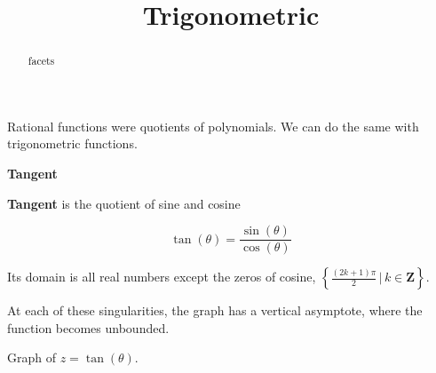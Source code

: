 \documentclass{ximera}
\title{Trigonometric}
\begin{document}
\begin{abstract}
facets
\end{abstract}
\maketitle




Rational functions were quotients of polynomials.  We can do the same with trigonometric functions.


\begin{definition}  \textbf{\textcolor{green!50!black}{Tangent}} 


\textbf{Tangent} is the quotient of sine and cosine


\[   \tan(\theta) = \frac{\sin(\theta)}{\cos(\theta)}      \]



Its domain is all real numbers except the zeros of cosine, $\left\{  \frac{(2k+1)\pi}{2}   \, | \,   k \in \textbf{Z}   \right\}$.

\end{definition}


At each of these singularities, the graph has a vertical asymptote, where the function becomes unbounded.




Graph of $z = \tan(\theta)$.
\end{document}
